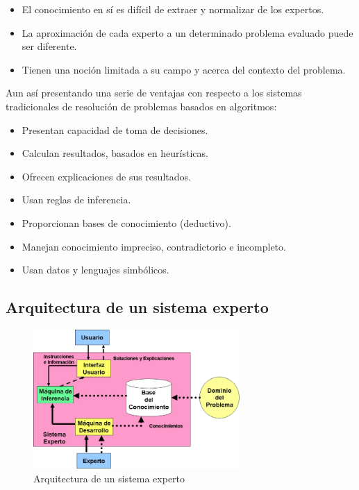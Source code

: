 \documentclass[a4paper, 11pt, titlepage]{article}
\begin{document}
    \begin{itemize}
        \item El conocimiento en sí es difícil de extraer y normalizar de los expertos.
        \item La aproximación de cada experto a un determinado problema evaluado puede ser diferente.
        \item Tienen una noción limitada a su campo y acerca del contexto del problema.
    \end{itemize}

    Aun así presentando una serie de ventajas con respecto a los sistemas tradicionales de 
    resolución de problemas basados en algoritmos:

    \begin{itemize}
        \item Presentan capacidad de toma de decisiones.
        \item Calculan resultados, basados en heurísticas.
        \item Ofrecen explicaciones de sus resultados.
        \item Usan reglas de inferencia.
        \item Proporcionan bases de conocimiento (deductivo).
        \item Manejan conocimiento impreciso, contradictorio e incompleto.
        \item Usan datos y lenguajes simbólicos.
    \end{itemize}

    \subsection{Arquitectura de un sistema experto}

        \begin{figure}[htp]
            \centering
            \includegraphics[width=0.7\textwidth]{resources/sistemaexperto.jpg}
            \caption{Arquitectura de un sistema experto}
            \label{sistemaexperto}
        \end{figure}
\end{document}
